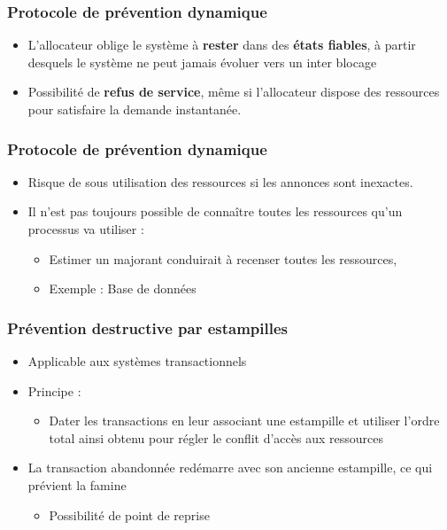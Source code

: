 \begin{frame}
\frametitle{Protocole de prévention dynamique}
\begin{itemize}
\item L'allocateur oblige le système à \textbf{rester} dans des \textbf{états fiables}, à partir desquels le système ne peut jamais évoluer vers un inter blocage
\item Possibilité de \textbf{refus de service}, même si l'allocateur dispose des ressources pour satisfaire la demande instantanée.
\end{itemize}
\end{frame}

\begin{frame}
\frametitle{Protocole de prévention dynamique}
\begin{itemize}
\item Risque de sous utilisation des ressources si les annonces sont inexactes.
\item Il n'est pas toujours possible de connaître toutes les ressources qu'un processus va utiliser :
\begin{itemize}
\item Estimer un majorant conduirait à recenser toutes les ressources,
\item Exemple : Base de données
\end{itemize}
\end{itemize}
\end{frame}

\begin{frame}
\frametitle{Prévention destructive par estampilles}
\begin{itemize}
\item Applicable aux systèmes transactionnels
\item Principe :
\begin{itemize}
\item Dater les transactions en leur associant une estampille et utiliser l'ordre total ainsi obtenu pour régler le conflit d'accès aux ressources
\end{itemize}
\item La transaction abandonnée redémarre avec son ancienne estampille, ce qui prévient la famine
\begin{itemize}
\item Possibilité de point de reprise
\end{itemize}
\end{itemize}
\end{frame}

